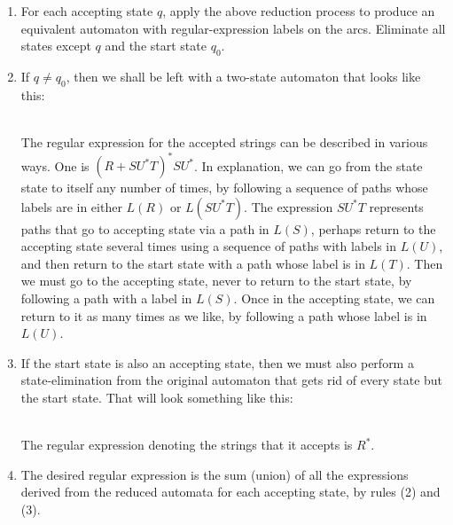 \documentclass[]{article}
\begin{document}
      \begin{enumerate}
        \item For each accepting state $q$, apply the above reduction process to
        produce an equivalent automaton with regular-expression labels on the
        arcs. Eliminate all states except $q$ and the start state $q_0$.
        \item If $q \neq q_0$, then we shall be left with a two-state automaton
        that looks like this:

           \\

        The regular expression for the accepted strings can be described in
        various ways. One is $(R + SU^*T)^*SU^*$. In explanation, we can go from
        the state state to itself any number of times, by following a sequence
        of paths whose labels are in either $L(R)$ or $L(SU^*T)$. The expression
        $SU^*T$ represents paths that go to accepting state via a path in
        $L(S)$, perhaps return to the accepting state several times using a
        sequence of paths with labels in $L(U)$, and then return to the start
        state with a path whose label is in $L(T)$. Then we must go to the
        accepting state, never to return to the start state, by following a path
        with a label in $L(S)$. Once in the accepting state, we can return to it
        as many times as we like, by following a path whose label is in $L(U)$.
        \item If the start state is also an accepting state, then we must also
        perform a state-elimination from the original automaton that gets rid of
        every state but the start state. That will look something like this:

           \\

        The regular expression denoting the strings that it accepts is $R^*$.
        \item The desired regular expression is the sum (union) of all the
        expressions derived from the reduced automata for each accepting state,
        by rules (2) and (3).
      \end{enumerate}
\end{document}
